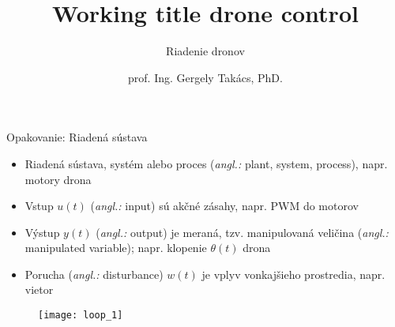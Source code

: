 \documentclass{beamer}
\title[Riadiace Algoritmy Dronov]
{Working title drone control}
\subtitle{\vspace{1em}Riadenie dronov}
\author[]{prof. Ing. Gergely Takács, PhD.}
\date[XX.12.2021]{}
\newcommand{\angl}[1]{{\color{gray}(\emph{angl.:} #1)}}
\begin{document}



%
%
%


%


\begin{frame}{Opakovanie: Riadená sústava}
  \begin{itemize}
    \item<1-> Riadená sústava, systém alebo proces \angl{plant, system, process}, napr. motory drona
    \item<2-> Vstup $u(t)$ \angl{input} sú akčné zásahy, napr. PWM do motorov
    \item<3-> Výstup $y(t)$ \angl{output} je meraná, tzv. manipulovaná veličina \angl{manipulated variable}; napr. klopenie $\theta(t)$ drona
    \item<4-> Porucha \angl{disturbance} $w(t)$ je vplyv vonkajšieho prostredia, napr. vietor
  \end{itemize}

\begin{figure}
\centering
  \texttt{[image: loop\_1]}\\
\end{figure}
\end{frame}
\end{document}
